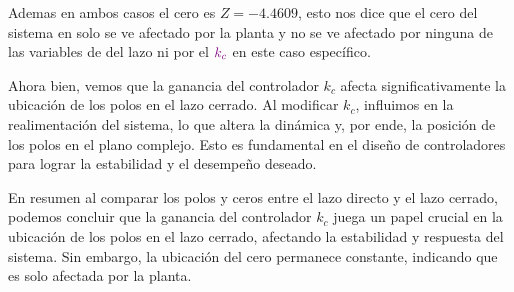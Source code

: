 Ademas en ambos casos el cero es \(Z= -4.4609\), esto nos dice que el cero del sistema en solo se ve afectado por la planta y no se ve afectado por ninguna de las variables de del lazo ni por el \(\mathbin{\color{violet}k_c}\) en este caso específico.

Ahora bien, vemos que la ganancia del controlador \( k_c \) afecta significativamente la ubicación de los polos en el lazo cerrado. Al modificar \( k_c \), influimos en la realimentación del sistema, lo que altera la dinámica y, por ende, la posición de los polos en el plano complejo. Esto es fundamental en el diseño de controladores para lograr la estabilidad y el desempeño deseado.

En resumen al comparar los polos y ceros entre el lazo directo y el lazo cerrado, podemos concluir que la ganancia del controlador \( k_c \) juega un papel crucial en la ubicación de los polos en el lazo cerrado, afectando la estabilidad y respuesta del sistema. Sin embargo, la ubicación del cero permanece constante, indicando que es solo afectada por la planta.